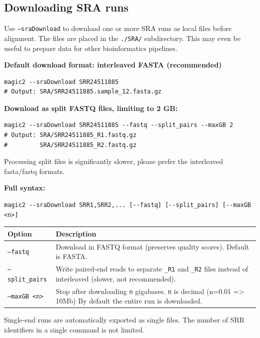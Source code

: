 \documentclass[11pt]{article}
\newcommand{\code}[1]{\texttt{#1}}
\begin{document}
\subsection{Downloading SRA runs}

Use \code{--sraDownload} to download one or more SRA runs as local files
before alignment.  The files are placed in the \code{./SRA/} subdirectory.
This may even be useful to prepare data for other bioinformatics pipelines.

\textbf{Default download format: interleaved FASTA (recommended)}
\begin{lstlisting}
magic2 --sraDownload SRR24511885
# Output: SRA/SRR24511885.sample_12.fasta.gz
\end{lstlisting}

\textbf{Download as split FASTQ files, limiting to 2 GB:}
\begin{lstlisting}
magic2 --sraDownload SRR24511885 --fastq --split_pairs --maxGB 2
# Output: SRA/SRR24511885_R1.fastq.gz
#         SRA/SRR24511885_R2.fastq.gz
\end{lstlisting}
Processing split files is significantly slower, please prefer the interleaved fasta/fastq formats.

\textbf{Full syntax:}
\begin{lstlisting}
magic2 --sraDownload SRR1,SRR2,... [--fastq] [--split_pairs] [--maxGB <n>]
\end{lstlisting}

\begin{center}
\begin{tabular}{lp{9cm}}
\toprule
\textbf{Option} & \textbf{Description} \\
\midrule
\code{--fastq}       & Download in FASTQ format (preserves quality scores).
                        Default is FASTA. \\
\code{--split\_pairs} & Write paired-end reads to separate \code{\_R1} and
                        \code{\_R2} files instead of interleaved (slower, not recommended). \\
\code{--maxGB <n>}   & Stop after downloading \code{n} gigabases. \code{n} is decimal (n=0.01 => 10Mb) 
                        By default the entire run is downloaded. \\
\bottomrule
\end{tabular}
\end{center}

Single-end runs are automatically exported as single files.
The number of SRR identifiers in a single
command is not limited.
\end{document}
